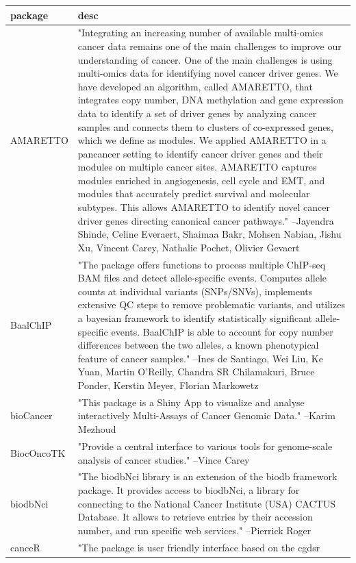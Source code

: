 \documentclass[]{article}
\begin{document}
\begin{longtable}[t]{l>{\raggedright\arraybackslash}p{25em}}
\toprule
package & desc\\
\midrule
AMARETTO & "Integrating an increasing number of available multi-omics
cancer data remains one of the main challenges to improve our
understanding of cancer. One of the main challenges is using
multi-omics data for identifying novel cancer driver genes. We
have developed an algorithm, called AMARETTO, that integrates
copy number, DNA methylation and gene expression data to
identify a set of driver genes by analyzing cancer samples and
connects them to clusters of co-expressed genes, which we
define as modules. We applied AMARETTO in a pancancer setting
to identify cancer driver genes and their modules on multiple
cancer sites. AMARETTO captures modules enriched in
angiogenesis, cell cycle and EMT, and modules that accurately
predict survival and molecular subtypes. This allows AMARETTO
to identify novel cancer driver genes directing canonical
cancer pathways." --Jayendra Shinde, Celine Everaert, Shaimaa Bakr, Mohsen Nabian, Jishu Xu, Vincent Carey, Nathalie Pochet, Olivier Gevaert\\
BaalChIP & "The package offers functions to process multiple ChIP-seq
BAM files and detect allele-specific events. Computes allele
counts at individual variants (SNPs/SNVs), implements extensive
QC steps to remove problematic variants, and utilizes a
bayesian framework to identify statistically significant
allele- specific events. BaalChIP is able to account for copy
number differences between the two alleles, a known
phenotypical feature of cancer samples." --Ines de Santiago, Wei Liu, Ke Yuan, Martin O'Reilly, Chandra SR Chilamakuri, Bruce Ponder, Kerstin Meyer, Florian Markowetz\\
bioCancer & "This package is a Shiny App to visualize and analyse
interactively Multi-Assays of Cancer Genomic Data." --Karim Mezhoud\\
BiocOncoTK & "Provide a central interface to various tools for
genome-scale analysis of cancer studies." --Vince Carey\\
biodbNci & "The biodbNci library is an extension of the biodb
framework package. It provides access to biodbNci, a library
for connecting to the National Cancer Institute (USA) CACTUS
Database. It allows to retrieve entries by their accession
number, and run specific web services." --Pierrick Roger\\
\addlinespace
canceR & "The package is user friendly interface based on the cgdsr

\end{longtable}
\end{document}
